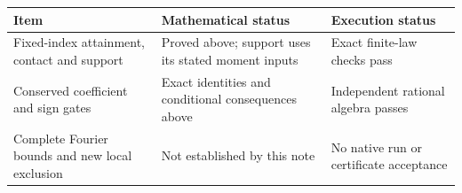 \begin{center}
\begin{tabular}{p{43mm}p{48mm}p{49mm}}
\toprule
Item & Mathematical status & Execution status\\
\midrule
Fixed-index attainment, contact and support & Proved above; support uses
its stated moment inputs & Exact finite-law checks pass\\
Conserved coefficient and sign gates & Exact identities and conditional
consequences above & Independent rational algebra passes\\
Complete Fourier bounds and new local exclusion & Not established by this
note & No native run or certificate acceptance\\
\bottomrule
\end{tabular}
\end{center}
